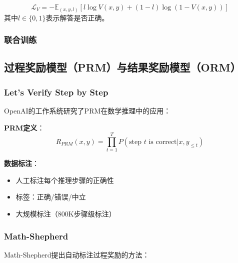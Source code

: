 \documentclass[12pt,a4paper]{article}
\newenvironment{algorithmic}[1][]%
      {\begin{list}{}{\leftmargin=2em\itemsep=0.2em\parsep=0pt\topsep=0.2em}}%
      {\end{list}}
\newcommand{\STATE}{\item[]}
\newcommand{\FOR}[1]{\item[]\textbf{for} ##1 \textbf{do}}
\newcommand{\ENDFOR}{\item[]\textbf{end for}}
\begin{document}
\begin{equation}
\mathcal{L}_V = -\mathbb{E}_{(x,y,l)}[l \log V(x,y) + (1-l)\log(1-V(x,y))]
\end{equation}
其中$l \in \{0, 1\}$表示解答是否正确。

\subsubsection{联合训练}


\subsection{过程奖励模型（PRM）与结果奖励模型（ORM）}

\subsubsection{Let's Verify Step by Step}

OpenAI的工作系统研究了PRM在数学推理中的应用：

\textbf{PRM定义}：
\begin{equation}
R_{PRM}(x, y) = \prod_{t=1}^{T} P(\text{step } t \text{ is correct} | x, y_{\leq t})
\end{equation}

\textbf{数据标注}：
\begin{itemize}
    \item 人工标注每个推理步骤的正确性
    \item 标签：正确/错误/中立
    \item 大规模标注（800K步骤级标注）
\end{itemize}

\subsubsection{Math-Shepherd}

Math-Shepherd提出自动标注过程奖励的方法：
\end{document}
